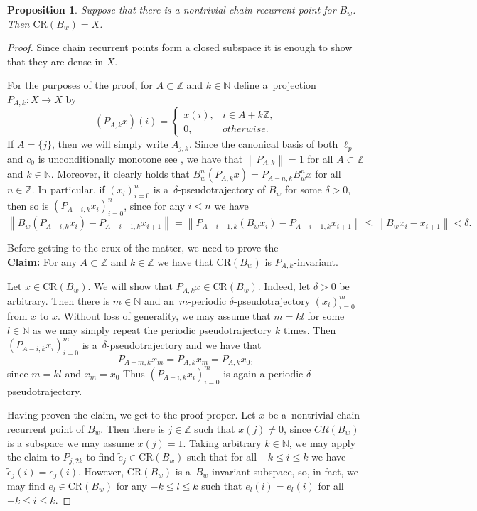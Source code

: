 \documentclass[11pt,a4paper]{amsart}
\newtheorem{proposition}[theorem]{Proposition}
\theoremstyle{definition}
\newcommand{\Z}{\mathbb{Z}}
\newcommand{\N}{\mathbb{N}}
\newcommand{\norm}[1]{\left\| #1 \right\|}
\newcommand{\CR}{\mathrm{CR}}
\begin{document}
	\begin{proposition} \label{prop:CRdichotomy}
		Suppose that there is a nontrivial chain recurrent point for \(B_w\). Then \(\CR(B_w) = X\).
	\end{proposition}
	\begin{proof}
		Since chain recurrent points form a closed subspace it is enough to show that they are dense in \(X\).
		
		For the purposes of the proof, for $A \subset \Z$ and $k \in \N$ define a~projection $P_{A, k}: X \to X$ by
		\begin{equation*}
			(P_{A,k}x)(i) = \begin{cases}
				x(i), &i \in A + k\Z,\\
				0, &otherwise.
			\end{cases}
		\end{equation*}
		If $A = \{j\}$, then we will simply write $A_{j, k}$.
		Since the canonical basis of both $\ell_p$ and $c_0$ is unconditionally monotone see \cite{BanachSpaceTheory}, we have that $\norm{P_{A,k}} = 1$ for all $A \subset \Z$ and $k \in \N$. Moreover, it clearly holds that $B_w^n(P_{A,k}x) = P_{A-n,k}B_w^nx$ for all $n \in \Z$. In particular, if $(x_i)_{i=0}^n$ is a~$\delta$-pseudotrajectory of \(B_w\) for some $\delta > 0$, then so is $(P_{A-i, k}x_i)_{i=0}^{n}$, since for any $i < n$ we have
		\begin{equation*}
			\norm{B_w(P_{A-i, k}x_i) - P_{A-i-1, k}x_{i+1}}
			= \norm{P_{A-i-1, k}(B_w x_i) - P_{A-i-1, k}x_{i+1}}
			\leq \norm{B_w x_i - x_{i+1}}
			< \delta.
		\end{equation*}
		
		Before getting to the crux of the matter, we need to prove the\\
		\textbf{Claim:} For any $A \subset \Z$ and \(k \in \Z\) we have that \(\CR(B_w)\) is \(P_{A,k}\)-invariant.
		
		Let $x \in \CR(B_w)$. We will show that $P_{A, k}x \in \CR(B_w)$. Indeed, let $\delta > 0$ be arbitrary. Then there is $m \in \N$ and an~$m$-periodic $\delta$-pseudotrajectory $(x_i)_{i=0}^m$ from $x$ to $x$. Without loss of generality, we may assume that $m = kl$ for some $l \in \N$ as we may simply repeat the periodic pseudotrajectory $k$ times. Then $(P_{A-i, k}x_i)_{i=0}^m$ is a~$\delta$-pseudotrajectory and we have that \[P_{A-m,k}x_{m} = P_{A,k}x_{m} = P_{A,k}x_{0},\] since \(m = kl\) and \(x_m = x_0\) Thus $(P_{A-i, k}x_i)_{i=0}^m$ is again a periodic \(\delta\)-pseudotrajectory.
		
		Having proven the claim, we get to the proof proper.
		Let \(x\) be a~nontrivial chain recurrent point of $B_w$. Then there is $j \in \Z$ such that $x(j) \neq 0$, since \(CR(B_w)\) is a subspace we may assume \(x(j)=1\). Taking arbitrary $k \in \N$, we may apply the claim to $P_{j, 2k}$ to find $\widetilde{e}_j \in \CR(B_w)$ such that for all $-k \leq i \leq k$ we have $\widetilde{e}_j(i) = e_j(i)$. However, $\CR(B_w)$ is a~$B_w$-invariant subspace, so, in fact, we may find $\widetilde{e}_l \in \CR(B_w)$ for any $-k \leq l \leq k$ such that $\widetilde{e}_l(i) = e_l(i)$ for all $-k \leq i \leq k$.
		

\end{proof}
\end{document}
